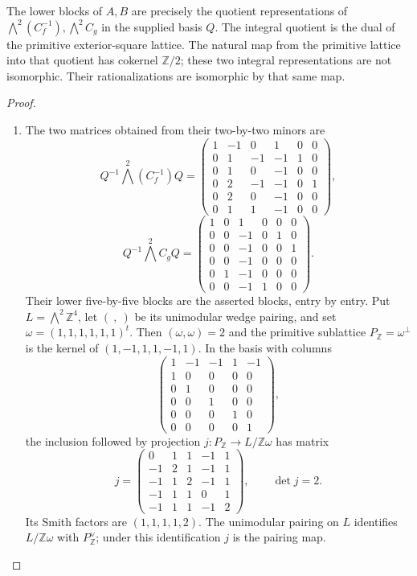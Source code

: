 \begin{theorem}\label{night:P1.2}
The lower blocks of $A,B$ are precisely the quotient representations of
$\bigwedge^2(C_f^{-1}),\bigwedge^2C_g$ in the supplied basis $Q$.
The integral quotient is the dual of the primitive exterior-square
lattice.  The natural map from the primitive lattice into that quotient
has cokernel $\mathbb Z/2$; these two integral representations are not
isomorphic.  Their rationalizations are isomorphic by that same map.
\end{theorem}
\begin{proof}
\begin{enumerate}[label=\arabic*.]
\item The two matrices obtained from their two-by-two minors are
\[
Q^{-1}\bigwedge^2(C_f^{-1})Q=
\begin{pmatrix}
1&-1&0&1&0&0\\0&1&-1&-1&1&0\\0&1&0&-1&0&0\\
0&2&-1&-1&0&1\\0&2&0&-1&0&0\\0&1&1&-1&0&0
\end{pmatrix},
\]
\[
Q^{-1}\bigwedge^2C_gQ=
\begin{pmatrix}
1&0&1&0&0&0\\0&0&-1&0&1&0\\0&0&-1&0&0&1\\
0&0&-1&0&0&0\\0&1&-1&0&0&0\\0&0&-1&1&0&0
\end{pmatrix}.
\]
Their lower five-by-five blocks are the asserted blocks, entry by entry.
Put $L=\bigwedge^2\mathbb Z^4$, let $(\ ,\ )$ be its unimodular wedge
pairing, and set $\omega=(1,1,1,1,1,1)^t$.
Then $(\omega,\omega)=2$ and the primitive sublattice
$P_{\mathbb Z}=\omega^\perp$ is the kernel of
$(1,-1,1,1,-1,1)$.  In the basis with columns
\[
\begin{pmatrix}
1&-1&-1&1&-1\\1&0&0&0&0\\0&1&0&0&0\\
0&0&1&0&0\\0&0&0&1&0\\0&0&0&0&1
\end{pmatrix},
\]
the inclusion followed by projection
$j:P_{\mathbb Z}\longrightarrow L/\mathbb Z\omega$ has matrix
\[
j=\begin{pmatrix}
0&1&1&-1&1\\-1&2&1&-1&1\\-1&1&2&-1&1\\
-1&1&1&0&1\\-1&1&1&-1&2
\end{pmatrix},\qquad \det j=2.
\]
Its Smith factors are $(1,1,1,1,2)$.  The unimodular pairing on $L$
identifies $L/\mathbb Z\omega$ with $P_{\mathbb Z}^\vee$;
under this identification $j$ is the pairing map.


\end{enumerate}
\end{proof}

